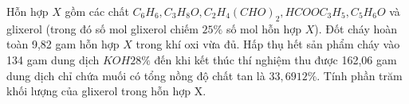 \begin{vd}
	Hỗn hợp $X$ gồm các chất $C_6 H_6, C_3 H_8 O, C_2 H_4(CHO)_2, HCOOC_3 H_5, C_5 H_6 O$ và glixerol (trong đó số mol glixerol chiếm $25\%$ số mol hỗn hợp $X$). Đốt cháy hoàn toàn 9,82 gam hỗn hợp $X$ trong khí oxi vừa đủ. Hấp thụ hết sản phẩm cháy vào 134 gam dung dịch $KOH 28\%$ đến khi kết thúc thí nghiệm thu được 162,06 gam dung dịch chỉ chứa muối có tổng nồng độ chất tan là $33,6912\%$. Tính phần trăm khối lượng của glixerol trong hỗn hợp X.
	\loigiai{
	}
\end{vd}

